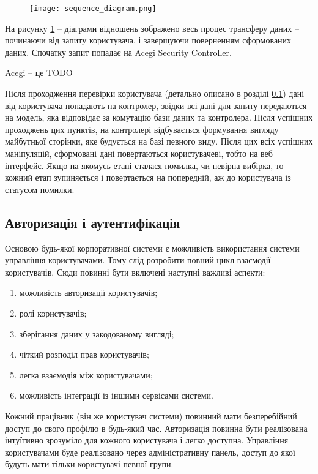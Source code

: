 \begin{figure}[!ht]
\centering
		\texttt{[image: sequence\_diagram.png]}
		\label{pic:sequence}
\end{figure}
\par На рисунку \ref{pic:sequence} -- діаграми відношень зображено весь процес трансферу даних -- починаючи від запиту користувача, і завершуючи поверненням сформованих даних. Спочатку запит попадає на Acegi Security Controller.
\par Acegi -- це TODO
\par Після проходження перевірки користувача (детально описано в розділі \ref{sec:authority}) дані від користувача попадають на контролер, звідки всі дані для запиту передаються на модель, яка відповідає за комутацію бази даних та контролера. Після успішних проходжень цих пунктів, на контролері відбувається формування вигляду майбутньої сторінки, яке будується на базі певного виду. Після цих всіх успішних маніпуляцій, сформовані дані повертаються користувачеві, тобто на веб інтерфейс. Якщо на якомусь етапі сталася помилка, чи невірна вибірка, то кожний етап зупиняється і повертається на попередній, аж до користувача із статусом помилки.

\subsection{Авторизація і аутентифікація}\label{sec:authority}
Основою будь-якої корпоративної системи є можливість використання системи управління користувачами.
Тому слід розробити повний цикл взаємодії користувачів. Сюди повинні бути включені наступні важливі аспекти:
\begin{enumerate}
	\item можливість авторизації користувачів;
	\item ролі користувачів;
	\item зберігання даних у закодованому вигляді;
	\item чіткий розподіл прав користувачів;
	\item легка взаємодія між користувачами;
	\item можливість інтеграції із іншими сервісами системи.
\end{enumerate}

\par Кожний працівник (він же користувач системи) повинний мати безперебійний доступ до свого профілю в будь-який час.
Авторизація повинна бути реалізована інтуїтивно зрозуміло для кожного користувача і легко доступна.
Управління користувачами буде реалізовано через адміністративну панель, доступ до якої будуть мати тільки користувачі певної групи.

